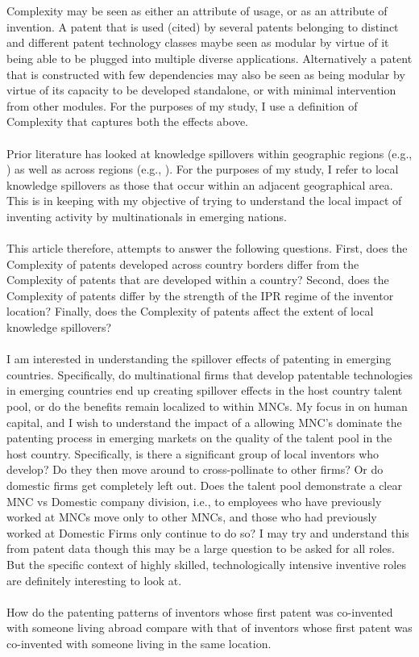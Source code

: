\documentclass[12pt]{article}
\begin{document}
\\\\
Complexity may be seen as either an attribute of usage, or as an attribute of invention. A patent that is used (cited) by several patents belonging to distinct and different patent technology classes maybe seen as modular by virtue of it being able to be plugged into multiple diverse applications. Alternatively a patent that is constructed with few dependencies may also be seen as being modular by virtue of its capacity to be developed standalone, or with minimal intervention from other modules. For the purposes of my study, I use a definition of Complexity that captures both the effects above. 
\\\\
Prior literature has looked at knowledge spillovers within geographic regions (e.g., \cite{Jaffe1993}) as well as across regions (e.g., \cite{Singh2007}). For the purposes of my study, I refer to local knowledge spillovers as those that occur within an adjacent geographical area. This is in keeping with my objective of trying to understand the local impact of inventing activity by multinationals in emerging nations. 
\\\\
This article therefore, attempts to answer the following questions. First, does the Complexity of patents developed across country borders differ from the Complexity of patents that are developed within a country? Second, does the Complexity of patents differ by the strength of the IPR regime of the inventor location? Finally, does the Complexity of patents affect the extent of local knowledge spillovers? 
\\\\
I am interested in understanding the spillover effects of patenting in emerging countries. Specifically, do multinational firms that develop patentable technologies in emerging countries end up creating spillover effects in the host country talent pool, or do the benefits remain localized to within MNCs. My focus in on human capital, and I wish to understand the impact of a allowing MNC's dominate the patenting process in emerging markets on the quality of the talent pool in the host country. Specifically, is there a significant group of local inventors who develop? Do they then move around to cross-pollinate to other firms? Or do domestic firms get completely left out. Does the talent pool demonstrate a clear MNC vs Domestic company division, i.e., to employees who have previously worked at MNCs move only to other MNCs, and those who had previously worked at Domestic Firms only continue to do so? I may try and understand this from patent data though this may be a large question to be asked for all roles. But the specific context of highly skilled, technologically intensive inventive roles are definitely interesting to look at.
\\\\
How do the patenting patterns of inventors whose first patent was co-invented with someone living abroad compare with that of inventors whose first patent was co-invented with someone living in the same location.
\end{document}

